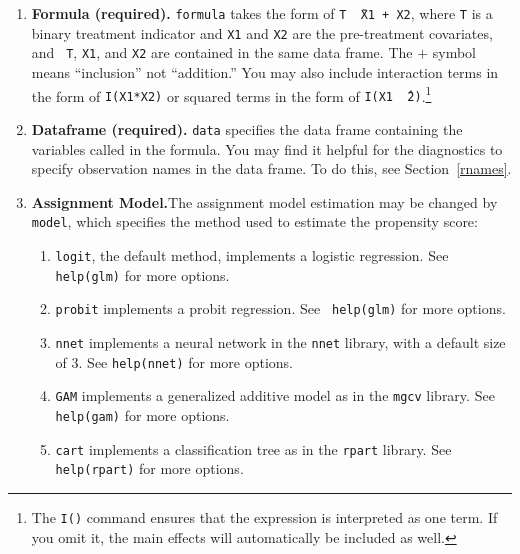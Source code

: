 \documentclass[oneside,letterpaper,titlepage]{article}
\begin{document}
\begin{enumerate}
  
\item \textbf{Formula (required).}  \texttt{formula} takes the form of
  {\tt T \~\ X1 + X2}, where {\tt T} is a binary treatment indicator
  and {\tt X1} and {\tt X2} are the pre-treatment covariates, and {\tt
    T}, {\tt X1}, and {\tt X2} are contained in the same data frame.
  The $+$ symbol means ``inclusion'' not ``addition.'' You may also
  include interaction terms in the form of {\tt I(X1*X2)} or squared
  terms in the form of {\tt I(X1 \^\ 2)}.\footnote{The \texttt{I()}
    command ensures that the expression is interpreted as one term.
    If you omit it, the main effects will automatically be included as
    well.}
  
\item \textbf{Dataframe (required).}  \texttt{data} specifies the data
  frame containing the variables called in the formula.  You may find
  it helpful for the diagnostics to specify observation names in the
  data frame.  To do this, see Section~\ref{rnames}.
  
\item \textbf{Assignment Model.}The assignment model estimation may be
  changed by \texttt{model}, which specifies the method used to
  estimate the propensity score:
  \begin{enumerate}
  \item \texttt{logit}, the default method, implements a logistic
    regression.  See {\tt help(glm)} for more options.
  \item \texttt{probit} implements a probit regression.  See {\tt
      help(glm)} for more options.
  \item \texttt{nnet} implements a neural network in the \texttt{nnet}
    library, with a default size of 3.  See {\tt help(nnet)} for more
    options.
  \item \texttt{GAM} implements a generalized additive model as in the
    \texttt{mgcv} library.  See {\tt help(gam)} for more options.
  \item \texttt{cart} implements a classification tree as in the
    \texttt{rpart} library.  See {\tt help(rpart)} for more options.
  \end{enumerate}
  

\end{enumerate}
\end{document}
